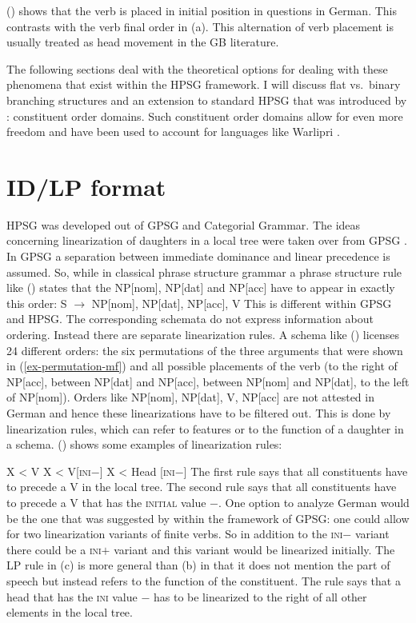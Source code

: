 \documentclass[output=paper]{langsci/langscibook}
\begin{document}
() shows that the verb is placed in initial position in questions in German. This contrasts
with the verb final order in (a). This alternation of verb placement is usually treated as
head movement in the GB literature.

The following sections deal with the theoretical options for dealing with these phenomena that exist
within the HPSG framework. I will discuss flat vs.\ binary branching structures and an extension to
standard HPSG that was introduced by \citet{Reape94a}: constituent order domains. Such constituent
order domains allow for even more freedom and have been used to account for languages like Warlipri
\citep{DS99a}.


\section{ID/LP format}

HPSG was developed out of GPSG and Categorial Grammar. The ideas concerning linearization of
daughters in a local tree were taken over from GPSG \citet*{GKPS85a}. In GPSG a separation between
immediate dominance and linear precedence is assumed. So, while in classical phrase structure
grammar a phrase structure rule like () states that the NP[nom], NP[dat] and NP[acc] have to
appear in exactly this order:
\ea
S $\to$ NP[nom], NP[dat], NP[acc], V
\z
This is different within GPSG and HPSG. The corresponding schemata do not express information about
ordering. Instead there are separate linearization rules. A schema like () licenses 24
different orders: the six permutations of the three arguments that were shown in
(\ref{ex-permutation-mf}) and all possible placements of the verb (to the right of NP[acc], between
NP[dat] and NP[acc], between NP[nom] and NP[dat], to the left of NP[nom]). Orders like NP[nom],
NP[dat], V, NP[acc] are not attested in German and hence these linearizations have to be filtered
out. This is done by linearization rules, which can refer to features or to the function of a
daughter in a schema. () shows some examples of linearization rules:

\eal
\ex X < V
\ex X < V[\textsc{ini}$-$]
\ex X < Head [\textsc{ini}$-$]
\zl
The first rule says that all constituents have to precede a V in the local tree. The second rule
says that all constituents have to precede a V that has the \textsc{initial} value $-$. One option
to analyze German would be the one that was suggested by \citet{Uszkoreit87a} within the framework
of GPSG: one could allow for two linearization variants of finite verbs. So in addition to the
\textsc{ini}$-$ variant there could be a \textsc{ini}$+$ variant and this variant would be
linearized initially. The LP rule in (c) is more general than (b) in that it does not
mention the part of speech but instead refers to the function of the constituent. The rule says that
a head that has the \textsc{ini} value $-$ has to be linearized to the right of all other elements
in the local tree.
\end{document}

